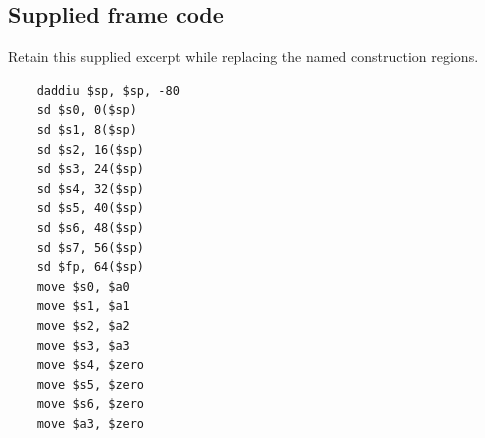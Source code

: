 \subsection*{Supplied frame code}
Retain this supplied excerpt while replacing the named construction regions.
\begin{verbatim}
    daddiu $sp, $sp, -80
    sd $s0, 0($sp)
    sd $s1, 8($sp)
    sd $s2, 16($sp)
    sd $s3, 24($sp)
    sd $s4, 32($sp)
    sd $s5, 40($sp)
    sd $s6, 48($sp)
    sd $s7, 56($sp)
    sd $fp, 64($sp)
    move $s0, $a0
    move $s1, $a1
    move $s2, $a2
    move $s3, $a3
    move $s4, $zero
    move $s5, $zero
    move $s6, $zero
    move $a3, $zero
\end{verbatim}
